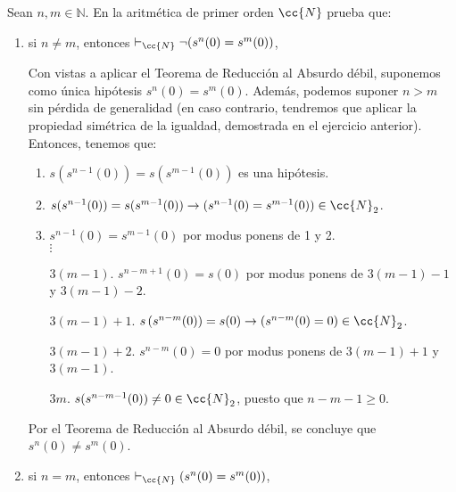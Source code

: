 \begin{ejercicio}
    Sean $n, m \in \mathbb{N}$. En la aritmética de primer orden $\cc{N}$ prueba que:
    \begin{enumerate}
        \item si $n \neq m$, entonces $\vdash_{\cc{N}} \neg (s^n(0) = s^m(0))$,
        
        Con vistas a aplicar el Teorema de Reducción al Absurdo débil, suponemos como única hipótesis $s^n(0) = s^m(0)$. Además, podemos suponer $n>m$ sin pérdida de generalidad (en caso contrario, tendremos que aplicar la propiedad simétrica de la igualdad, demostrada en el ejercicio anterior). Entonces, tenemos que:
        \begin{enumerate}[label=\arabic*.]
            \item $s(s^{n-1}(0)) = s(s^{m-1}(0))$ es una hipótesis.
            \item $s(s^{n-1}(0)) = s(s^{m-1}(0))\to (s^{n-1}(0)=s^{m-1}(0))\in \cc{N}_2$.
            \item $s^{n-1}(0)=s^{m-1}(0)$ por modus ponens de 1 y 2.\\
            $\vdots$
            \item [$3(m-1).$] $s^{n-m+1}(0)=s(0)$ por modus ponens de $3(m-1)-1$ y $3(m-1)-2$.
            \item [$3(m-1)+1.$] $s\left(s^{n-m}(0)\right)=s(0)\to \left(s^{n-m}(0)=0\right)\in \cc{N}_2$.
            \item [$3(m-1)+2.$] $s^{n-m}(0)=0$ por modus ponens de $3(m-1)+1$ y $3(m-1)$.
            \item [$3m.$] $s(s^{n-m-1}(0))\neq 0\in \cc{N}_2$, puesto que $n-m-1\geq 0$.
        \end{enumerate}

        Por el Teorema de Reducción al Absurdo débil, se concluye que $s^n(0) \neq s^m(0)$.\\
        \item si $n = m$, entonces $\vdash_{\cc{N}} (s^n(0) = s^m(0))$,
        

\end{enumerate}
\end{ejercicio}
